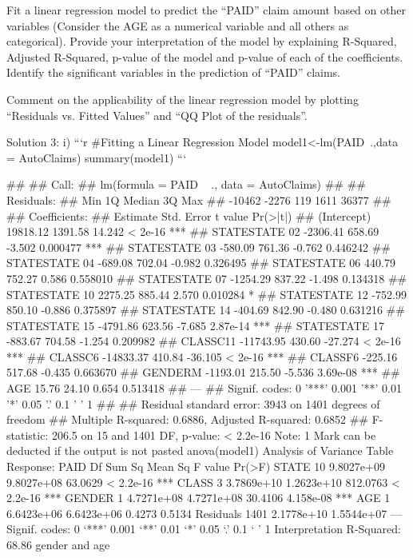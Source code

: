 \documentclass[a4paper,12pt]{article}
\begin{document}
\large



Fit a linear regression model to predict the “PAID” claim amount based on other variables (Consider the AGE as a numerical variable and all others as categorical).
Provide your interpretation of the model by explaining R-Squared, Adjusted R-Squared, p-value of the model and p-value of each of the coefficients. Identify the
significant variables in the prediction of “PAID” claims. 

Comment on the applicability of the linear regression model by plotting “Residuals vs. Fitted Values” and “QQ Plot of the residuals”. 

Solution 3:
i)
```{r}
#Fitting a Linear Regression Model
model1<-lm(PAID~.,data = AutoClaims)
summary(model1)
```

##
## Call:
## lm(formula = PAID ~ ., data = AutoClaims)
##
## Residuals:
## Min 1Q Median 3Q Max
## -10462 -2276 119 1611 36377
##
## Coefficients:
##
Estimate Std. Error t value Pr(>|t|)
## (Intercept) 19818.12 1391.58 14.242 < 2e-16 ***
## STATESTATE 02 -2306.41 658.69 -3.502 0.000477 ***
## STATESTATE 03 -580.09 761.36 -0.762 0.446242
## STATESTATE 04 -689.08 702.04 -0.982 0.326495
## STATESTATE 06 440.79 752.27 0.586 0.558010
## STATESTATE 07 -1254.29 837.22 -1.498 0.134318
## STATESTATE 10 2275.25 885.44 2.570 0.010284 *
## STATESTATE 12 -752.99 850.10 -0.886 0.375897
## STATESTATE 14 -404.69 842.90 -0.480 0.631216
## STATESTATE 15 -4791.86 623.56 -7.685 2.87e-14 ***
## STATESTATE 17 -883.67 704.58 -1.254 0.209982
## CLASSC11 -11743.95 430.60 -27.274 < 2e-16 ***
## CLASSC6
-14833.37 410.84 -36.105 < 2e-16 ***
## CLASSF6
-225.16 517.68 -0.435 0.663670
## GENDERM
-1193.01 215.50 -5.536 3.69e-08 ***
## AGE
15.76 24.10 0.654 0.513418
## ---
## Signif. codes: 0 '***' 0.001 '**' 0.01 '*' 0.05 '.' 0.1 ' ' 1
##
## Residual standard error: 3943 on 1401 degrees of freedom
## Multiple R-squared: 0.6886, Adjusted R-squared: 0.6852
## F-statistic: 206.5 on 15 and 1401 DF, p-value: < 2.2e-16
Note: 1 Mark can be deducted if the output is not pasted
anova(model1)
Analysis of Variance Table
Response: PAID
Df Sum Sq Mean Sq F value Pr(>F)
STATE
10 9.8027e+09 9.8027e+08 63.0629 < 2.2e-16 ***
CLASS
3 3.7869e+10 1.2623e+10 812.0763 < 2.2e-16 ***
GENDER
1 4.7271e+08 4.7271e+08 30.4106 4.158e-08 ***
AGE
1 6.6423e+06 6.6423e+06 0.4273 0.5134
Residuals 1401 2.1778e+10 1.5544e+07
---
Signif. codes: 0 ‘***’ 0.001 ‘**’ 0.01 ‘*’ 0.05 ‘.’ 0.1 ‘ ’ 1
Interpretation
R-Squared: 68.86%
gender and age
\end{document}
